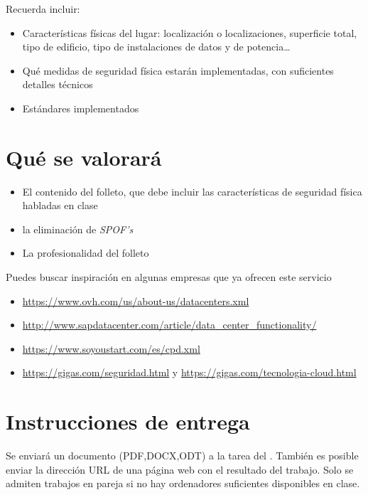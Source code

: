 Recuerda incluir:
\begin{itemize}
\item Características físicas del lugar: localización o localizaciones, superficie total, tipo de edificio, tipo de instalaciones de datos y de potencia…
\item Qué medidas de seguridad física estarán implementadas, con suficientes detalles técnicos
\item Estándares implementados
\end{itemize}

\section{Qué se valorará}
\begin{itemize}
\item El contenido del folleto, que debe incluir las características de seguridad física habladas en clase
\item la eliminación de \textit{SPOF's}
\item La profesionalidad del folleto
\end{itemize}

Puedes buscar inspiración en algunas empresas que ya ofrecen este servicio
\begin{itemize}
\item \url{https://www.ovh.com/us/about-us/datacenters.xml}
\item \url{http://www.sapdatacenter.com/article/data_center_functionality/}
\item \url{https://www.soyoustart.com/es/cpd.xml}
\item \url{https://gigas.com/seguridad.html} y \url{https://gigas.com/tecnologia-cloud.html}
\end{itemize}

\section{Instrucciones de entrega}
Se enviará un documento (PDF,DOCX,ODT) a la tarea del .
También es posible enviar la dirección URL de una página web con el resultado del trabajo.
Solo se admiten trabajos en pareja si no hay ordenadores suficientes disponibles en clase.




 




